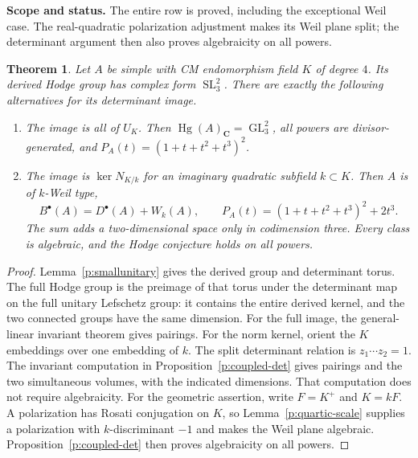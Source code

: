 \documentclass[11pt,reqno]{article}
\theoremstyle{emphasizedplain}
\newtheorem{theorem}{Theorem}[section]
\theoremstyle{emphasizeddefinition}
\theoremstyle{emphasizeddefinition}
\DeclareMathOperator{\Hg}{Hg}
\DeclareMathOperator{\GL}{GL}
\DeclareMathOperator{\SL}{SL}
\newcommand{\C}{\mathbf C}
\newcommand{\status}[1]{%
  \par\nobreak\smallskip\noindent
  {\setlength{\fboxsep}{7pt}%
   \colorbox{ScopeBackground}{%
    \parbox{\dimexpr\linewidth-2\fboxsep\relax}{%
     \small\textbf{\textcolor{HeadingInk}{Scope and status.}} #1}}}%
  \par\nobreak\medskip}
\begin{document}
\status{The entire row is proved, including the exceptional Weil case.
The real-quadratic polarization adjustment makes its Weil plane split;
the determinant argument then also proves algebraicity on all powers.}
\begin{theorem}
Let $A$ be simple with CM endomorphism field $K$ of degree $4$.
Its derived Hodge group has complex form $\SL_{3}^{2}$.
There are exactly the following alternatives for its determinant image.
\begin{enumerate}
\item The image is all of $U_K$. Then $\Hg(A)_\C=\GL_{3}^{2}$,
all powers are divisor-generated, and $P_A(t)=(1+t+t^2+t^3)^2$.
\item The image is $\ker N_{K/k}$ for an imaginary quadratic subfield
$k\subset K$. Then $A$ is of $k$-Weil type,
\[
 B^\bullet(A)=D^\bullet(A)+W_k(A),\qquad
 P_A(t)=(1+t+t^2+t^3)^2+2t^3.
\]
The sum adds a two-dimensional space only in codimension three.
Every class is algebraic, and the Hodge conjecture holds on all powers.
\end{enumerate}
\end{theorem}
\begin{proof}
Lemma~\ref{p:smallunitary} gives the derived group and determinant torus.
The full Hodge group is the preimage of that torus under the determinant
map on the full unitary Lefschetz group: it contains the entire derived
kernel, and the two connected groups have the same dimension.
For the full image, the general-linear invariant theorem gives pairings.
For the norm kernel, orient the $K$ embeddings over one embedding of $k$.
The split determinant relation is $z_1\cdots z_{2}=1$.
The invariant computation in Proposition~\ref{p:coupled-det} gives pairings
and the two simultaneous volumes, with the indicated dimensions. That
computation does not require algebraicity. For the geometric assertion,
write $F=K^+$ and $K=kF$. A polarization has Rosati conjugation on $K$,
so Lemma~\ref{p:quartic-scale} supplies a polarization with $k$-discriminant
$-1$ and makes the Weil plane algebraic. Proposition~\ref{p:coupled-det}
then proves algebraicity on all powers.
\end{proof}
\end{document}

